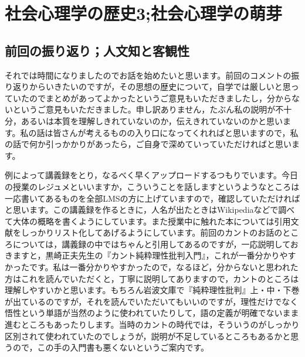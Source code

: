 \documentclass{ltjsbook}
\begin{document}
\setcounter{chapter}{3}
\chapter{社会心理学の歴史3;社会心理学の萌芽}
\label{sp04_history1}
\section{前回の振り返り；人文知と客観性}
それでは時間になりましたのでお話を始めたいと思います。前回のコメントの振り返りからいきたいのですが，その思想の歴史について，自学では厳しいと思っていたのでまとめがあってよかったというご意見もいただきましたし，分からないというご意見もいただきました。申し訳ありません，たぶん私の説明が不十分，あるいは本質を理解しきれていないのか，伝えきれていないのかと思います。私の話は皆さんが考えるものの入り口になってくれればと思いますので，私の話で何か引っかかりがあったら，ご自身で深めていっていただければと思います。

例によって講義録をとり，なるべく早くアップロードするつもりでいます。今日の授業のレジュメといいますか，こういうことを話しますというようなところは一応書いてあるものを全部LMSの方に上げていますので，確認していただければと思います。この講義録を作るときに，人名が出たときはWikipediaなどで調べて大体の概略を書くようにしています。また授業中に触れた本については引用文献をしっかりリスト化してあげるようにしています。前回のカントのお話のところについては，講義録の中ではちゃんと引用してあるのですが，一応説明しておきますと，黒崎正夫先生の『カント純粋理性批判入門』\parencite{Kurosaki2000}，これが一番分かりやすかったです。私は一番分かりやすかったので，なるほど，分からないと思われた方はこれを読んでいただくと，丁寧に説明してありますので，カントのところは理解しやすいかと思います。もちろん岩波文庫で『純粋理性批判』上・中・下巻が出ているのですが\parencite{Kant1961}，それを読んでいただいてもいいのですが，理性だけでなく悟性という単語が当然のように使われていたりして，語の定義が明確でないまま進むところもあったりします。当時のカントの時代では，そういうのがしっかり区別されて使われていたのでしょうが，説明が不足しているところもあるかと思うので，この手の入門書も悪くないというご案内です。
\end{document}
